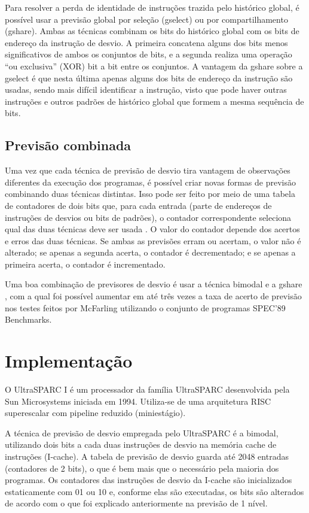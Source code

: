 \documentclass[12pt]{article}
\begin{document}
 Para resolver a perda de identidade de instruções trazida pelo histórico global, é possível usar a previsão global por seleção (gselect) ou por
 compartilhamento (gshare).
 Ambas as técnicas combinam os bits do histórico global com os bits de endereço da instrução de desvio. A primeira concatena alguns dos bits menos significativos de
 ambos os conjuntos de bits, e a segunda realiza uma operação ``ou exclusiva'' (XOR) bit a bit entre os conjuntos. A vantagem da gshare sobre a gselect é que
 nesta última apenas alguns dos bits de endereço da instrução são usadas, sendo mais difícil identificar a instrução\cite{schemes}, visto que pode haver outras
 instruções e outros padrões de histórico global que formem a mesma sequência de bits.

\subsection{Previsão combinada}

Uma vez que cada técnica de previsão de desvio tira vantagem de observações diferentes da execução dos programas, é possível criar novas formas de previsão
combinando duas técnicas distintas. Isso pode ser feito por meio de uma tabela de contadores de dois bits que, para cada entrada (parte de endereços de
instruções de desvios ou bits de padrões), o contador correspondente seleciona qual das duas técnicas deve ser usada \cite{mcfarling}. O valor do contador depende dos acertos
e erros das duas técnicas. Se ambas as previsões erram ou acertam, o valor não é alterado; se apenas a segunda acerta, o contador é decrementado; e se apenas a
primeira acerta, o contador é incrementado.

Uma boa combinação de previsores de desvio é usar a técnica bimodal e a gshare \cite{mcfarling}, com a qual foi possível aumentar em até três vezes a taxa de
acerto de previsão nos testes feitos por McFarling utilizando o conjunto de programas SPEC'89 Benchmarks.

\section{Implementação}
  
  O UltraSPARC I é um processador da família UltraSPARC desenvolvida pela Sun Microsystems iniciada em 1994. Utiliza-se de uma arquitetura RISC
  superescalar com pipeline reduzido (miniestágio).
  
  A técnica de previsão de desvio empregada pelo UltraSPARC é a bimodal, utilizando dois bits a cada duas instruções de desvio na memória cache de instruções
  (I-cache).
  A tabela de previsão de desvio guarda até 2048 entradas (contadores de 2 bits), o que é bem mais que o necessário pela maioria dos programas. Os contadores
  das instruções de desvio da I-cache são inicializados estaticamente com 01 ou 10 e, conforme elas são executadas, os bits são alterados de acordo com o que foi explicado anteriormente na previsão de 1 nível.
  
\end{document}
